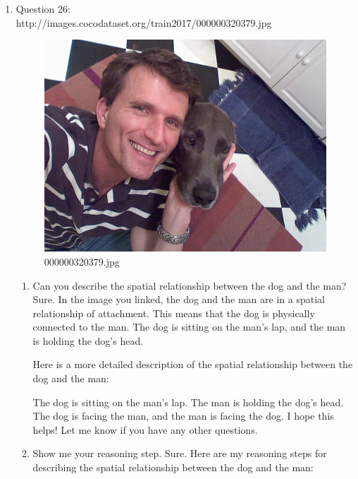 \begin{enumerate}
\begin{enumerate}
        The ball is completely inside the dog's mouth.
        The dog's mouth is closed tightly around the ball.
        The dog is holding the ball in its mouth.
        The ball is not visible anywhere else in the image.
        Based on these observations, I concluded that the dog has the ball in its mouth. This is a spatial relationship of possession.
    \end{enumerate}
    \item Question 26:\\http://images.cocodataset.org/train2017/000000320379.jpg
    \begin{figure}[h]
        \centering
        \includegraphics[width=0.8\linewidth]{../image set/easy/000000320379.jpg}
        \caption{000000320379.jpg}
    \end{figure}
    \begin{enumerate}
        \item Can you describe the spatial relationship between the dog and the man?
        \subitem Sure. In the image you linked, the dog and the man are in a spatial relationship of attachment. This means that the dog is physically connected to the man. The dog is sitting on the man's lap, and the man is holding the dog's head.

        Here is a more detailed description of the spatial relationship between the dog and the man:
        
        The dog is sitting on the man's lap.
        The man is holding the dog's head.
        The dog is facing the man, and the man is facing the dog.
        I hope this helps! Let me know if you have any other questions.
        \item Show me your reasoning step.
        \subitem Sure. Here are my reasoning steps for describing the spatial relationship between the dog and the man:


\end{enumerate}
\end{enumerate}
